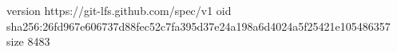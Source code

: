 version https://git-lfs.github.com/spec/v1
oid sha256:26fd967e606737d88fec52c7fa395d37e24a198a6d4024a5f25421e105486357
size 8483
